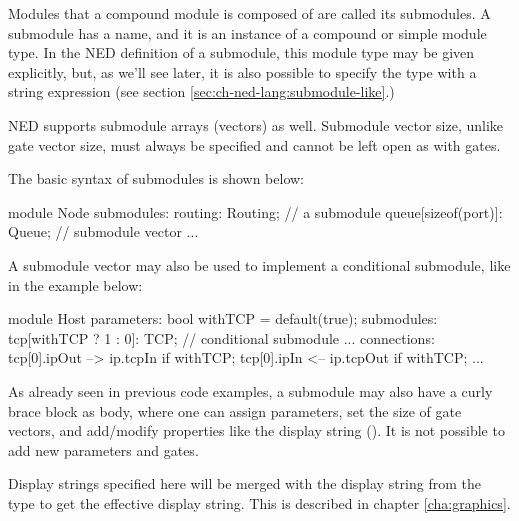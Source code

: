 Modules that a compound module is composed of are called its submodules.
A submodule has a name, and it is an instance of a compound or simple
module type. In the NED definition of a submodule, this module type
may be given explicitly, but, as we'll see later, it is also possible
to specify the type with a string expression (see section
\ref{sec:ch-ned-lang:submodule-like}.)

NED supports submodule arrays (vectors) as well. Submodule vector size,
unlike gate vector size, must always be specified and cannot be left
open as with gates.

The basic syntax of submodules is shown below:

\begin{ned}
module Node
{
    submodules:
        routing: Routing;   // a submodule
        queue[sizeof(port)]: Queue;  // submodule vector
        ...
}
\end{ned}

A submodule vector may also be used to implement a conditional submodule,
like in the example below:

\begin{ned}
module Host
{
    parameters:
        bool withTCP = default(true);
    submodules:
        tcp[withTCP ? 1 : 0]: TCP;  // conditional submodule
        ...
    connections:
        tcp[0].ipOut --> ip.tcpIn if withTCP;
        tcp[0].ipIn <-- ip.tcpOut if withTCP;
        ...
}
\end{ned}

As already seen in previous code examples, a submodule may also have a
curly brace block as body, where one can assign parameters, set the size of gate vectors, and add/modify
properties like the display string (). It is not possible to
add new parameters and gates.

Display strings specified here will be merged with the display string
from the type to get the effective display string. This is described
in chapter \ref{cha:graphics}.



